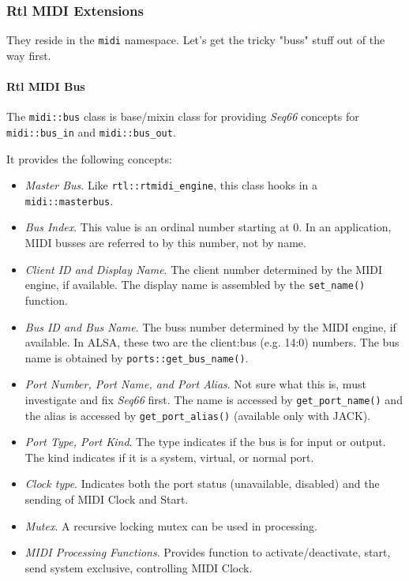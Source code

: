 \subsubsection{Rtl MIDI Extensions}
\label{subsubsec:rtl_midi_extensions}

   They reside in the \texttt{midi} namespace.
   Let's get the tricky "buss" stuff out of the way first.

\paragraph{Rtl MIDI Bus}
\label{paragraph:rtl_midi_extensions_bus}

   The \texttt{midi::bus} class is base/mixin class for providing
   \textsl{Seq66} concepts for \texttt{midi::bus\_in} and
   \texttt{midi::bus\_out}.

   It provides the following concepts:

   \begin{itemize}
      \item \textsl{Master Bus}.
         Like \texttt{rtl::rtmidi\_engine}, this class hooks in a
         \texttt{midi::masterbus}.
      \item \textsl{Bus Index}.
         This value is an ordinal number starting at 0.
         In an application, MIDI busses are referred to by this number, not
         by name.
      \item \textsl{Client ID and Display Name}.
         The client number determined by the MIDI engine, if available.
         The display name is assembled by the \texttt{set\_name()} function.
      \item \textsl{Bus ID and Bus Name}.
         The buss number determined by the MIDI engine, if available.
         In ALSA, these two are the client:bus (e.g. 14:0) numbers.
         The bus name is obtained by \texttt{ports::get\_bus\_name()}.
      \item \textsl{Port Number, Port Name, and Port Alias}.
         Not sure what this is, must investigate and fix \textsl{Seq66}
         first.
         The name is accessed by \texttt{get\_port\_name()} and the
         alias is accessed by \texttt{get\_port\_alias()} (available
         only with JACK).
      \item \textsl{Port Type, Port Kind}.
         The type indicates if the bus is for input or output.
         The kind indicates if it is a system, virtual, or normal port.
      \item \textsl{Clock type}.
         Indicates both the port status (unavailable, disabled) and the
         sending of MIDI Clock and Start.
      \item \textsl{Mutex}.
         A recursive locking mutex can be used in processing.
      \item \textsl{MIDI Processing Functions}.
         Provides function to activate/deactivate, start, send system exclusive,
         controlling MIDI Clock.
   \end{itemize}

